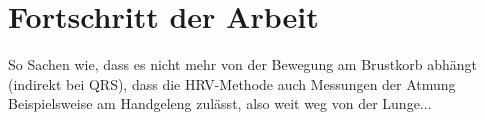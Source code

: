 

\chapter{Fortschritt der Arbeit}
So Sachen wie, dass es nicht mehr von der Bewegung am Brustkorb abhängt (indirekt bei QRS), dass die HRV-Methode auch Messungen der Atmung Beispielsweise am Handgeleng zulässt, also weit weg von der Lunge...
